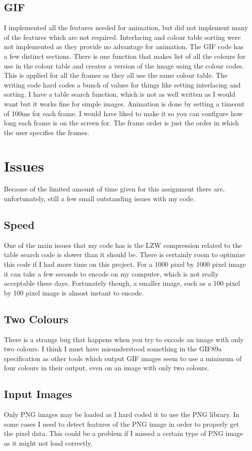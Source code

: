 \documentclass[11pt]{article} %
\begin{document}
\subsection{GIF}
I implemented all the features needed for animation, but did not implement many of the features which are not required. Interlacing and colour table sorting were not implemented as they provide no advantage for animation. The GIF code has a few distinct sections. There is one function that makes list of all the colours for use in the colour table and creates a version of the image using the colour codes. This is applied for all the frames as they all use the same colour table. The writing code hard codes a bunch of values for things like setting interlacing and sorting. I have a table search function, which is not as well written as I would want but it works fine for simple images. Animation is done by setting a timeout of 100ms for each frame. I would have liked to make it so you can configure how long each frame is on the screen for. The frame order is just the order in which the user specifies the frames.
\section{Issues}
Because of the limited amount of time given for this assignment there are, unfortunately, still a few small outstanding issues with my code.
\subsection{Speed}
One of the main issues that my code has is the LZW compression related to the table search code is slower than it should be. There is certainly room to optimize this code if I had more time on this project. For a 1000 pixel by 1000 pixel image it can take a few seconds to encode on my computer, which is not really acceptable these days. Fortunately though, a smaller image, such as a 100 pixel by 100 pixel image is almost instant to encode.
\subsection{Two Colours}
There is a strange bug that happens when you try to encode an image with only two colours. I think I must have misunderstood something in the GIF89a specification as other tools which output GIF images seem to use a minimum of four colours in their output, even on an image with only two colours.
\subsection{Input Images}
Only PNG images may be loaded as I hard coded it to use the PNG library. In some cases I need to detect features of the PNG image in order to properly get the pixel data. This could be a problem if I missed a certain type of PNG image as it might not load correctly.
\end{document}
